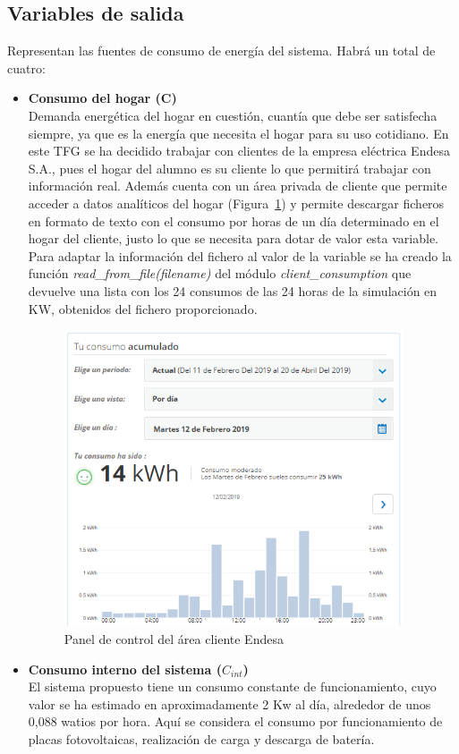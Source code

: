 \subsection{Variables de salida}
Representan las fuentes de consumo de energía del sistema. Habrá un total de cuatro:
\begin{itemize}
\item \textbf{Consumo del hogar (C)}\\Demanda energética del hogar en cuestión, cuantía que debe ser satisfecha siempre, ya que es la energía que necesita el hogar para su uso cotidiano. En este \gls{TFG} se ha decidido trabajar con clientes de la empresa eléctrica Endesa S.A., pues el hogar del alumno es su cliente lo que permitirá trabajar con información real. Además cuenta con un área privada de cliente que permite acceder a datos analíticos del hogar (Figura~\ref{fig:endesa}) y permite descargar ficheros en formato de texto con el consumo por horas de un día determinado en el hogar del cliente, justo lo que se necesita para dotar de valor esta variable. Para adaptar la información del fichero al valor de la variable se ha creado la función \textit{read\_from\_file(filename)} del módulo \textit{client\_consumption} que devuelve una lista con los 24 consumos de las 24 horas de la simulación en KW, obtenidos del fichero proporcionado.
  \begin{figure}[H]
    \centering
    \includegraphics[width=10cm]{figs/Endesa.PNG}
    \caption{Panel de control del área cliente Endesa}
    \label{fig:endesa}
  \end{figure}
\item \textbf{Consumo interno del sistema ($ C_{int} $)}\\El sistema propuesto tiene un consumo constante de funcionamiento, cuyo valor se ha estimado en aproximadamente 2 Kw al día, alrededor de unos 0,088 watios por hora. Aquí se considera el consumo por funcionamiento de placas fotovoltaicas, realización de carga y descarga de batería.

\end{itemize}
